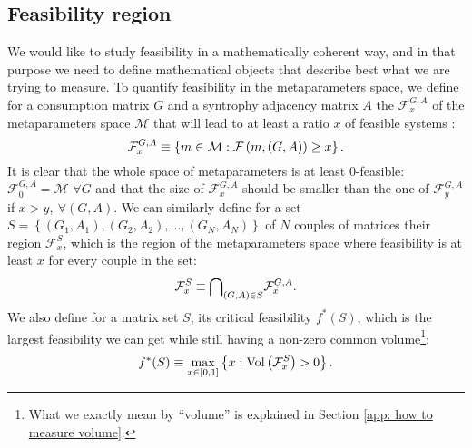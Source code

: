 \documentclass[12pt, titlepage]{report}
\begin{document}
\subsection{Feasibility region}\label{sec : methods feasibility volume}
We would like to study feasibility in a mathematically coherent way, and in that purpose we need to define mathematical objects that describe best what we are trying to measure. To quantify feasibility in the metaparameters space, we define for a consumption matrix $G$ and a syntrophy adjacency matrix $A$ the  $\mathcal{F}^{G,A}_x$ of the metaparameters space $\mathcal{M}$ that will lead to at least a ratio $x$ of feasible systems \ie :
\begin{equation}
\mathcal{F}^{G,A}_x \equiv \left\{m \in \mathcal{M} : \mathcal{F}\left(m, (G,A)\right)\geq x \right\}. \label{eq : x feasible volume}
\end{equation}
It is clear that the whole space of metaparameters is at least $0$-feasible: $\mathcal{F}^{G,A}_0 = \mathcal{M}$ $\forall G$ and that the size of $\mathcal{F}^{G,A}_{x}$ should be smaller than the one of $\mathcal{F}^{G,A}_{y}$ if $ x > y, \ \forall (G, A)$. We can similarly define for a set $S = \left\{ (G_1,A_1) , (G_2, A_2), \dots, (G_N, A_N)\right\}$ of $N$ couples of matrices their  region $\mathcal{F}^S_x$, which is the region of the metaparameters space where feasibility is at least $x$ for every couple in the set:
\begin{equation}
\mathcal{F}^S_x \equiv {\bigcap}_{(G,A) \in S} \mathcal{F}^{G,A}_x.
\end{equation}
We also define for a matrix set $S$, its critical feasibility $f^*(S)$, which is the largest feasibility we can get while still having a non-zero common volume\footnote{What we exactly mean by ``volume'' is explained in Section \ref{app: how to measure volume}.}:
\begin{equation}
f^*(S) \equiv \max_{x \in \left[0,1\right]}\left\{ x : \text{Vol}\left(\mathcal{F}^S_x\right) > 0 \right\}. \label{eq : feasibility methods critical common feasibility}
\end{equation}
%
\end{document}
